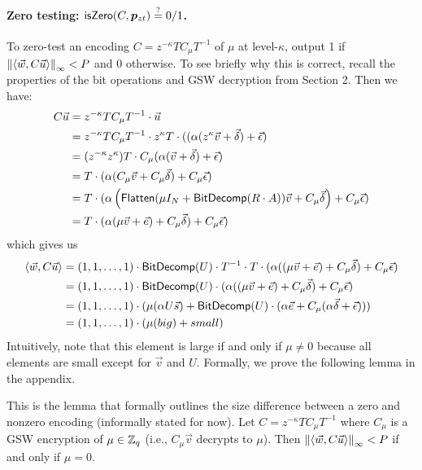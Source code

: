 \paragraph{Zero testing:  $\mathsf{isZero}(C, \bm{p}_{zt}) \stackrel{?}{=} 0/1$.}  To zero-test an encoding $C = z^{-\kappa} T C_\mu T^{-1}$ of $\mu$ at level-$\kappa$, output 1 if $\left\lVert\left<\vec{w}, C\vec{u}\right>\right\rVert_\infty < P$ and 0 otherwise.  To see briefly why this is correct, recall the properties of the bit operations and GSW decryption from Section 2.  Then we have:
\begin{align*}
C\vec{u} &= z^{-\kappa} T C_\mu T^{-1} \cdot \vec{u}\\
&= z^{-\kappa} T C_\mu  T^{-1} \cdot z^\kappa T\cdot ((\alpha(z^\kappa\vec{v} + \vec{\delta}) + \vec{\epsilon})\\
&= (z^{-\kappa} z^{\kappa}) T \cdot C_\mu (\alpha(\vec{v} + \vec{\delta}) + \vec{\epsilon})\\
&= T \cdot (\alpha(C_\mu\vec{v} + C_\mu\vec{\delta}) + C_\mu\vec{\epsilon})\\
&= T \cdot (\alpha\left(\mathsf{Flatten}(\mu I_{N} + \mathsf{BitDecomp}(R\cdot A))\vec{v} + C_\mu\vec{\delta}\right) + C_\mu\vec{\epsilon})\\
&= T \cdot (\alpha(\mu \vec{v} + \vec{e}) + C_\mu\vec{\delta}) + C_\mu\vec{\epsilon})
\end{align*}
which gives us
\begin{align*}
\left<\vec{w}, C\vec{u}\right> &= (1,1,\ldots,1)\cdot\mathsf{BitDecomp}(U)\cdot T^{-1}\cdot T \cdot (\alpha((\mu \vec{v} + \vec{e}) + C_\mu\vec{\delta}) + C_\mu\vec{\epsilon})\\
&= (1,1,\ldots,1)\cdot\mathsf{BitDecomp}(U) \cdot (\alpha((\mu \vec{v} + \vec{e}) + C_\mu\vec{\delta}) + C_\mu\vec{\epsilon})\\
&= (1,1,\ldots,1)\cdot(\mu(\alpha U \vec{s}) + \mathsf{BitDecomp}(U)\cdot (\alpha\vec{e} + C_\mu(\alpha\vec{\delta} + \vec{\epsilon})))\\
&= (1,1,\ldots,1)\cdot(\mu(big) + small)
\end{align*} 
Intuitively, note that this element is large if and only if $\mu \not= 0$ because all elements are small except for $\vec{v}$ and $U$.  Formally, we prove the following lemma in the appendix.

\begin{lemma}
\label{zerotesting}
This is the lemma that formally outlines the size difference between a zero and nonzero encoding (informally stated for now).  Let $C = z^{-\kappa} TC_\mu T^{-1}$ where $C_\mu$ is a GSW encryption of $\mu \in \mathbb{Z}_q$ (i.e., $C_\mu\vec{v}$ decrypts to $\mu$).  Then $\left\lVert\left<\vec{w}, C\vec{u}\right>\right\rVert_\infty < P$ if and only if $\mu = 0$.
\end{lemma}

